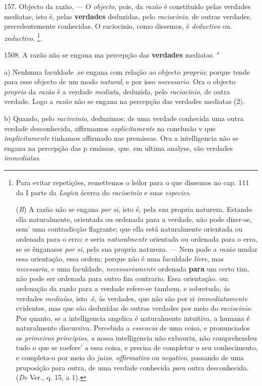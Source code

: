 157. Objecto da razão, --- O \emph{objecto}, pois, da \emph{razão} é constituido pelas verdades mediatas, isto é, pelas \textbf{verdades} deduzidas, pelo \emph{raciocinio}, de outras verdades, precedentemente conhecidas. O raciocinio, como dissemos, é \emph{deductivo} ou. \emph{znductivo}. \footnote{Para evitar repetições, remettemos o leilor para o que dissemos no cap. 111 da I parte da \emph{Logica} ácerca do \emph{raciocinio} e suas \emph{especies}.\par (\emph{B}) A razão não se engana \emph{por si}, isto é, pela sua propria natureza. Estando ella naturalmente, orientada ou ordenada para a verdade, não pode dizer-se, sem' uma contradicção flagrante; que ella está naturalmente orientada ou ordenada para o erro; e seria \emph{naturalmente} orientada ou ordenada para o erro, se se ênganasss \emph{por si}, pela sua propria natureza. --- Nem pode a \emph{razão} mudar essa orientação, essa ordem; porque não é uma faculdade \emph{livre}, mas \emph{necessaria}, e uma faculdade, \emph{necessariamente} ordenada \textbf{para} um certo tim, não pode ser ordenada para outro fim contrario. Essa orientação. ou: ordenação da razdo para a verdade refere-se tambem, e sobretudo, ás verdades \emph{mediaías}, isto .é, ás verdades, que não são por si \emph{immediatamente} evidentes, mas que são deduzidas de outras verdades por meio do \emph{raciocinio}. Por quanto, se a intelligencia angelica é naturalmente intuitiva, a humana é naturalmente discursiva. Percebida a \emph{essencia} de uma coisa, e pronunciados os \emph{primeiros principios}, \emph{a} nossa intelligencia não exbauriu, não comprehendeu tudo o que se roefere' a essa coisa, e precisa de completar o seu conhecimento, e completa-o por meio do \emph{juizo}. \emph{offirmativo} ou \emph{negativo}, passando de uma pruposição para outra, de uma verdade conhecida \emph{para} outra desconhecida. (\emph{De} Ver., q. 15, a 1).}.

1508. A razão não se engana ma percepção das \textbf{verdades} mediatas. "

a) Nenhuma faculdade .se engana com relação ao objecto \emph{proprio}; porque tende para esse objecto de um modo \emph{natural}, e por isso \emph{necessario}. Ora o objecto \emph{proprio} da \emph{razão} é a verdade \emph{mediata}, deduzida, pelo \emph{raciocinio}, de outra verdade. Logo a \emph{razão} não se engana na percepção das verdades mediatas (2).

b) Quando, pelo \emph{racivcinio}, deduzimos: de uma verdade conhecida uma outra verdade desconhecida, affirmamos \emph{explicitamente} na conclusão v que \emph{implicitamente} tinhamos affirmado nas premissas. Ora a intelligencia não se engana na percepção das p emássas, que. em ultima analyse, são verdades \emph{immediatas}.

